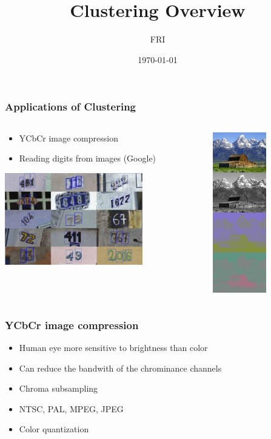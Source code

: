 \documentclass{beamer}
\begin{document}
\title{Clustering Overview}
\author{FRI}
\date{\today} 

\begin{frame}
\titlepage
\end{frame}

\begin{frame}
\frametitle{Applications of Clustering}
    \begin{columns}[t]
        \begin{column}[T]{9cm}
        \begin{itemize}
        \item YCbCr image compression
        \item Reading digits from images (Google)
        \end{itemize}

        \vspace{10mm}
        \hspace{7mm}
        \includegraphics[height=4cm]{googlehousenumbers.jpg}

        \end{column}

        \begin{column}[T]{10cm}
        \includegraphics[height=7cm]{YCbCr-separation-small.jpg}
        \end{column}
    \end{columns}
\end{frame} 

\begin{frame}
\frametitle{YCbCr image compression}
    \begin{itemize}
    \item Human eye more sensitive to brightness than color
    \item Can reduce the bandwith of the chrominance channels
    \item Chroma subsampling
    \item NTSC, PAL, MPEG, JPEG
    \item Color quantization
    \end{itemize}
\end{frame}
\end{document}
